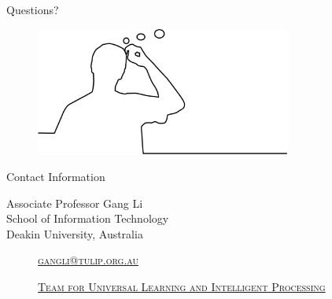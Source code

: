 \documentclass[
 size=14pt,
 paper=smartboard,  %
 mode=present, 		%
 display=slides, 	%
 style=tuliplab,  	%
 pauseslide,
 fleqn,leqno]{powerdot}{}
\begin{document}
%
\begin{slide}[toc=,bm=]{Questions?}
\begin{center}
\vspace{2cm}
\begin{figure}
    \includegraphics[width=0.75\textwidth]{figures//theme3//question.eps}
\end{figure}
\end{center}
\end{slide}


\begin{wideslide}[toc=,bm=]{Contact Information}
\centering
{}
\twocolumn[
lcolwidth=0.35\linewidth,
rcolwidth=0.65\linewidth
]
{
}
{
Associate Professor Gang Li\\
School of Information Technology\\
Deakin University, Australia
\begin{description}
 \item[\textcolor{orange}{\faEnvelope}] \href{mailto:gangli@tulip.org.au}
 {\textsc{\footnotesize{gangli@tulip.org.au}}}

 \item[\textcolor{orange}{\faHome}] \href{http://www.tulip.org.au}
 {\textsc{\footnotesize{Team for Universal Learning and Intelligent Processing}}}
\end{description}
}
\end{wideslide}
\end{document}
